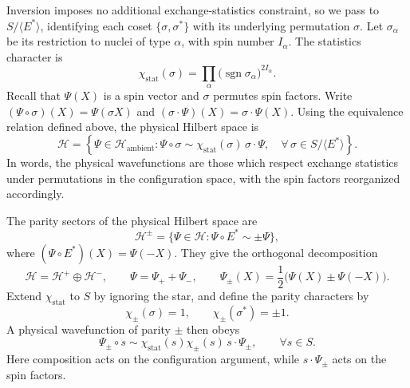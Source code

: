 \documentclass[12pt]{article}
\newcommand{\hilb}{\mathcal{H}}
\newcommand{\act}{\mathbin{\cdot}}
\newcommand{\stat}{\chi_{\mathrm{stat}}}
\begin{document}
Inversion imposes no additional exchange-statistics
constraint, so we pass to $S/\langle E^*\rangle$,
identifying each coset $\{\sigma,\sigma^*\}$ with its
underlying permutation $\sigma$. Let $\sigma_\alpha$
be its restriction to nuclei of type $\alpha$, with
spin number $I_\alpha$. The statistics character is
\[
\stat(\sigma)
=
\prod_\alpha
\bigl(\operatorname{sgn}\sigma_\alpha\bigr)^{2I_\alpha}.
\]
Recall that $\Psi(X)$ is a spin vector and $\sigma$ permutes
spin factors. Write
$(\Psi\circ\sigma)(X)=\Psi(\sigma X)$ and
$(\sigma\cdot\Psi)(X)=\sigma\cdot\Psi(X)$. Using the equivalence relation defined above,
the physical Hilbert space is
\[
\hilb
=
\left\{
\Psi\in\hilb_{\mathrm{ambient}}
:
\Psi\circ\sigma
\sim
\stat(\sigma)\,\sigma\act\Psi,
\quad\forall\,\sigma\in S/\langle E^*\rangle
\right\}.
\]
In words, the physical wavefunctions are those which respect
exchange statistics under permutations in the configuration
space, with the spin factors reorganized accordingly.

The parity sectors of the physical Hilbert space are
\[
\hilb^\pm=\{\Psi\in\hilb:\Psi\circ E^*\sim\pm\Psi\},
\]
where $(\Psi\circ E^*)(X)=\Psi(-X)$.
They give the orthogonal decomposition
\[
\hilb=\hilb^+\oplus\hilb^-,
\qquad
\Psi=\Psi_++\Psi_-,
\qquad
\Psi_\pm(X)=\frac12\bigl(\Psi(X)\pm\Psi(-X)\bigr).
\]
Extend $\stat$ to $S$ by ignoring the star, and define
the parity characters by
\[
\chi_\pm(\sigma)=1,
\qquad
\chi_\pm(\sigma^*)=\pm1.
\]
A physical wavefunction of parity $\pm$ then obeys
\[
\Psi_\pm\circ s
\sim
\stat(s)\chi_\pm(s)\,s\cdot\Psi_\pm,
\qquad\forall s\in S.
\]
Here composition acts on the configuration argument,
while $s\cdot\Psi_\pm$ acts on the spin factors.


\end{document}
